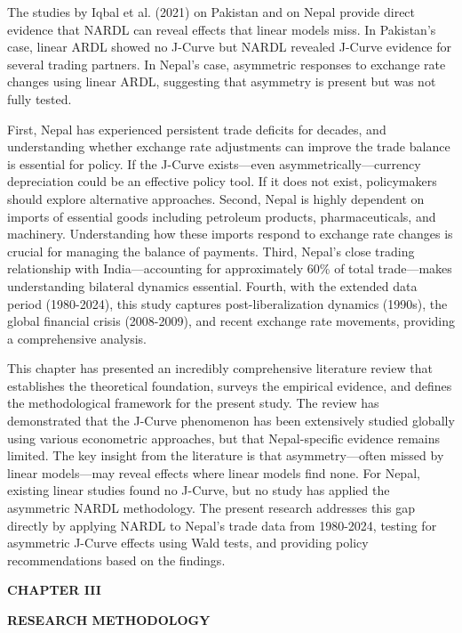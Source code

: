 \documentclass[12pt]{article}
\begin{document}
The studies by Iqbal et al. (2021) on Pakistan and \textcite{Bishwakarma2024-fa} on Nepal provide direct evidence that NARDL can reveal effects that linear models miss. In Pakistan's case, linear ARDL showed no J-Curve but NARDL revealed J-Curve evidence for several trading partners. In Nepal's case, asymmetric responses to exchange rate changes using linear ARDL, suggesting that asymmetry is present but was not fully tested.

First, Nepal has experienced persistent trade deficits for decades, and understanding whether exchange rate adjustments can improve the trade balance is essential for policy. If the J-Curve exists—even asymmetrically—currency depreciation could be an effective policy tool. If it does not exist, policymakers should explore alternative approaches. Second, Nepal is highly dependent on imports of essential goods including petroleum products, pharmaceuticals, and machinery. Understanding how these imports respond to exchange rate changes is crucial for managing the balance of payments. Third, Nepal's close trading relationship with India—accounting for approximately 60\% of total trade—makes understanding bilateral dynamics essential. Fourth, with the extended data period (1980-2024), this study captures post-liberalization dynamics (1990s), the global financial crisis (2008-2009), and recent exchange rate movements, providing a comprehensive analysis.

This chapter has presented an incredibly comprehensive literature review that establishes the theoretical foundation, surveys the empirical evidence, and defines the methodological framework for the present study. The review has demonstrated that the J-Curve phenomenon has been extensively studied globally using various econometric approaches, but that Nepal-specific evidence remains limited. The key insight from the literature is that asymmetry—often missed by linear models—may reveal effects where linear models find none. For Nepal, existing linear studies found no J-Curve, but no study has applied the asymmetric NARDL methodology. The present research addresses this gap directly by applying NARDL to Nepal's trade data from 1980-2024, testing for asymmetric J-Curve effects using Wald tests, and providing policy recommendations based on the findings.

\newpage
\begin{center}
\textbf{CHAPTER III}
\end{center}
\begin{center}
\textbf{RESEARCH METHODOLOGY}
\end{center}
\end{document}
